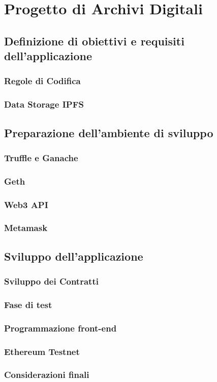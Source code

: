 \chapter{Progetto di Archivi Digitali}
\label{ch:archivi}

\section{Definizione di obiettivi e requisiti dell’applicazione}

\subsection{Regole di Codifica}

\subsection{Data Storage IPFS}

\section{Preparazione dell'ambiente di sviluppo}

\subsection{Truffle e Ganache}

\subsection{Geth}

\subsection{Web3 API}

\subsection{Metamask}

\section{Sviluppo dell'applicazione}

\subsection{Sviluppo dei Contratti}

\subsection{Fase di test}

\subsection{Programmazione front-end}

\subsection{Ethereum Testnet}

\subsection{Considerazioni finali}


